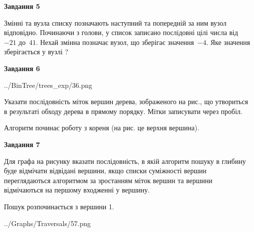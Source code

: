\documentclass[12pt, ukrainian]{article}
\begin{document}
{\begin {large}
{\begin {center}\textbf{Завдання 5}\end {center}}\par
Змінні  та  вузла списку позначають наступний та попередній за ним вузол відповідно. Починаючи з голови, у список записано послідовні цілі числа від~$-21$ до~$41$. Нехай змінна  позначає вузол, що зберігає значення~$-4$.
Яке значення зберігається у вузлі  ?\par
\newpage

{\begin {center}\textbf{Завдання 6}\end {center}}\par

\begin{center}
	{../BinTree/trees_exp/36.png}
\end{center}
Указати послідовність міток вершин дерева, зображеного на рис., що утвориться в результаті обходу дерева в прямому порядку. Мітки записувати через пробіл.\par Алгоритм починає роботу з кореня (на рис. це верхня вершина).\par
\newpage

{\begin {center}\textbf{Завдання 7}\end {center}}\par
Для графа на рисунку вказати послідовність, в якій алгоритм пошуку в глибину буде відмічати відвідані вершини, якщо списки суміжності вершин переглядаються алгоритмом за зростанням міток вершин та вершини відмічаються на першому вход\-женні у вершину.\par
Пошук розпочинається з вершини 1.\par

\begin{center}
	{../Graphs/Traversals/57.png}
\end{center}\par
\newpage


\end{large}}
\end{document}
